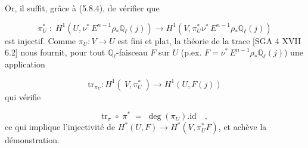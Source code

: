\begin{center}
\end{center}
Or, il suffit, grâce à (5.8.4), de vérifier que

\begin{equation*}
\pi_U^* \;:\; H^1(U,\nu^*\, E^{n-1}\rho_*\mathbb{Q}_\ell(j)) \longrightarrow H^1(V,\pi_U^*\nu^*\, E^{n-1}\rho_*\mathbb{Q}_\ell(j))
\end{equation*}
est injectif. Comme $\pi_U : V \longrightarrow U$ est fini et plat, la théorie de la trace [SGA 4 XVII 6.2] nous fournit, pour tout $\mathbb{Q}_\ell$-faisceau $F$ sur $U$ (p.ex. $F = \nu^*\, E^{n-1}\rho_*\mathbb{Q}_\ell(j)$) une application

\begin{equation*}
\mathrm{tr}_{\pi_U} : H^1(\ V,\pi_U^*\ ) \longrightarrow H^1(U,F(j))
\end{equation*}
qui vérifie

\begin{equation*}
\mathrm{tr}_{\pi} \;\circ\; \pi^* \;=\; \deg(\pi_U).\mathrm{id} \quad ,
\end{equation*}
ce qui implique l'injectivité de $H^*(U,F) \longrightarrow H^*(V,\pi_U^*F)$, et achève la démonstration.




